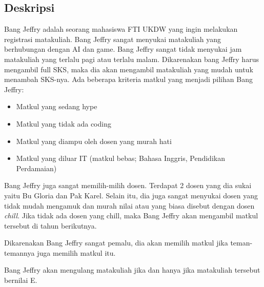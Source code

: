 \documentclass{article}
\begin{document}
\subsection{Deskripsi}
Bang Jeffry adalah seorang mahasiswa FTI UKDW yang ingin melakukan registrasi
matakuliah. Bang Jeffry sangat menyukai matakuliah yang berhubungan dengan AI
dan game. Bang Jeffry sangat tidak menyukai jam matakuliah yang terlalu pagi atau 
terlalu malam. Dikarenakan bang Jeffry harus mengambil full SKS, maka dia akan mengambil
matakuliah yang mudah untuk menambah SKS-nya. Ada beberapa kriteria matkul yang menjadi pilihan Bang Jeffry:
\begin{itemize}
  \item Matkul yang sedang hype
  \item Matkul yang tidak ada coding
  \item Matkul yang diampu oleh dosen yang murah hati
  \item Matkul yang diluar IT (matkul bebas; Bahasa Inggris, Pendidikan Perdamaian)
\end{itemize}


Bang Jeffry juga sangat memilih-milih dosen. Terdapat 2 dosen yang dia sukai yaitu 
Bu Gloria dan Pak Karel. Selain itu, dia juga sangat menyukai dosen yang tidak mudah mengamuk dan
murah nilai atau yang biasa disebut dengan dosen \emph{chill}. Jika tidak ada dosen yang chill, maka
Bang Jeffry akan mengambil matkul tersebut di tahun berikutnya.


Dikarenakan Bang Jeffry sangat pemalu, dia akan memilih matkul jika teman-temannya 
juga memilih matkul itu.


\indent Bang Jeffry akan mengulang matakuliah jika dan hanya jika matakuliah tersebut bernilai E.
\end{document}
